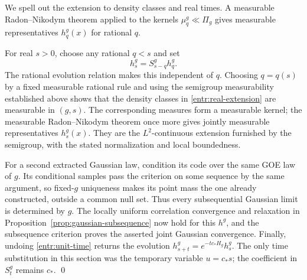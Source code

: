 We spell out the extension to density classes and real times.  A measurable
Radon--Nikodym theorem applied to the kernels
\(\mu_q^g\ll\Pi_g\) gives measurable representatives \(h_q^g(x)\)
for rational \(q\).

For real \(s>0\), choose any rational \(q<s\) and set
\begin{equation}\label{entr:real-extension}
 h_s^g=S_{s-q}^g h_q^g .
\end{equation}
The rational evolution relation makes this independent of \(q\).
Choosing \(q=q(s)\) by a fixed measurable rational rule and using
the semigroup measurability established above shows that the density
classes in \eqref{entr:real-extension} are measurable in \((g,s)\).
The corresponding measures form a measurable kernel; the measurable
Radon--Nikodym theorem once more gives jointly measurable
representatives \(h_s^g(x)\).  They are the \(L^2\)-continuous
extension furnished by the semigroup, with the stated normalization
and local boundedness.

For a second extracted Gaussian law, condition its code over the same
GOE law of \(g\).  Its conditional samples pass the criterion on some
sequence by the same argument, so fixed-\(g\) uniqueness makes its
point mass the one already constructed, outside a common null set.
Thus every subsequential Gaussian limit is determined by \(g\).
The locally uniform correlation convergence and relaxation in
Proposition~\ref{prop:gaussian-subsequence} now hold for this
\(h^g\), and the subsequence criterion proves the asserted joint
Gaussian convergence.  Finally, undoing \eqref{entr:unit-time}
returns the evolution \(h_{s+t}^g=e^{-t c_*H_g}h_s^g\).
The only time substitution in this section was the temporary variable
\(u=c_*s\); the coefficient in \(S_t^g\) remains \(c_*\).
\qed

